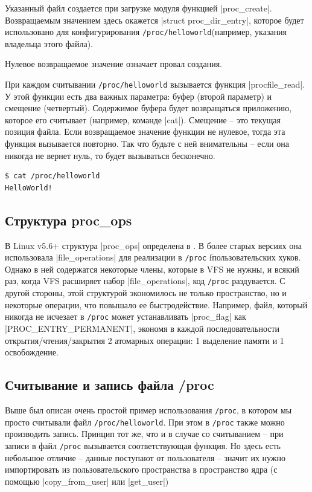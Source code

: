 \documentclass[10pt, oneside]{book}
\begin{document}
Указанный файл создается при загрузке модуля функцией \cpp|proc_create|.
Возвращаемым значением здесь окажется \cpp|struct proc_dir_entry|, которое будет использовано для конфигурирования \verb|/proc/helloworld|(например, указания владельца этого файла).

Нулевое возвращаемое значение означает провал создания.

При каждом считывании \verb|/proc/helloworld| вызывается функция \cpp|procfile_read|.
У этой функции есть два важных параметра: буфер (второй параметр) и смещение (четвертый). Содержимое буфера будет возвращаться приложению, которое его
считывает (например, команде \sh|cat|).
Смещение – это текущая позиция файла. Если возвращаемое значение функции не нулевое, тогда эта функция вызывается повторно. Так что будьте с ней внимательны – если она никогда не вернет нуль, то будет вызываться бесконечно.

\begin{verbatim}
$ cat /proc/helloworld
HelloWorld!
\end{verbatim}


\subsection{Структура proc\_ops}
\label{sec:proc_ops}
В Linux v5.6+ структура \cpp|proc_ops| определена в .
В более старых версиях она использовала \cpp|file_operations| для реализации в \verb|/proc| fпользовательских хуков. Однако в ней содержатся некоторые члены, которые в VFS не нужны, и всякий раз, когда VFS расширяет набор \cpp|file_operations|, код \verb|/proc| раздувается. С другой стороны, этой структурой экономилось не только пространство, но и некоторые операции, что повышало ее быстродействие.
Например, файл, который никогда не исчезает в \verb|/proc| может устанавливать \cpp|proc_flag| как \cpp|PROC_ENTRY_PERMANENT|,
экономя в каждой последовательности открытия/чтения/закрытия 2 атомарных операции: 1 выделение памяти и 1 освобождение.

\subsection{Считывание и запись файла /proc}
\label{sec:read_write_procfs}
Выше был описан очень простой пример использования \verb|/proc|, в котором мы просто считывали файл \verb|/proc/helloworld|.
При этом в \verb|/proc| также можно производить запись. Принцип тот же, что и в случае со считыванием – при записи в файл \verb|/proc| вызывается
соответствующая функция.
Но здесь есть небольшое отличие – данные поступают от пользователя – значит их нужно импортировать из пользовательского пространства в пространство ядра (с помощью \cpp|copy_from_user| или \cpp|get_user|)
\end{document}

